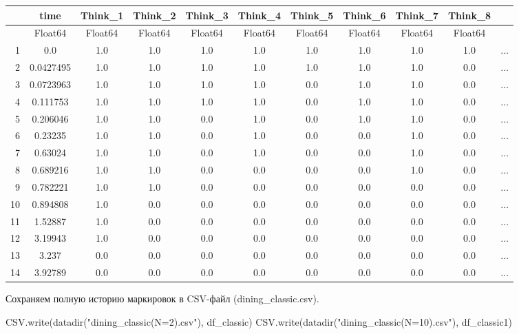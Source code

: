 \documentclass[
  12pt,
  a4paper,
  DIV=11,
  numbers=noendperiod]{scrreprt}
\newenvironment{Shaded}{\begin{snugshade}}{\end{snugshade}}
\newcommand{\FunctionTok}[1]{\textcolor[rgb]{0.28,0.35,0.67}{#1}}
\newcommand{\NormalTok}[1]{\textcolor[rgb]{0.00,0.23,0.31}{#1}}
\newcommand{\StringTok}[1]{\textcolor[rgb]{0.13,0.47,0.30}{#1}}
\begin{document}
\begin{tabular}{r|cccccccccc}
    & time & Think\_1 & Think\_2 & Think\_3 & Think\_4 & Think\_5 & Think\_6 & Think\_7 & Think\_8 & \\
    \hline
    & Float64 & Float64 & Float64 & Float64 & Float64 & Float64 & Float64 & Float64 & Float64 & \\
    \hline
    1 & 0.0 & 1.0 & 1.0 & 1.0 & 1.0 & 1.0 & 1.0 & 1.0 & 1.0 & $\dots$ \\
    2 & 0.0427495 & 1.0 & 1.0 & 1.0 & 1.0 & 1.0 & 1.0 & 1.0 & 0.0 & $\dots$ \\
    3 & 0.0723963 & 1.0 & 1.0 & 1.0 & 1.0 & 0.0 & 1.0 & 1.0 & 0.0 & $\dots$ \\
    4 & 0.111753 & 1.0 & 1.0 & 1.0 & 1.0 & 0.0 & 1.0 & 1.0 & 0.0 & $\dots$ \\
    5 & 0.206046 & 1.0 & 1.0 & 0.0 & 1.0 & 0.0 & 1.0 & 1.0 & 0.0 & $\dots$ \\
    6 & 0.23235 & 1.0 & 1.0 & 0.0 & 1.0 & 0.0 & 0.0 & 1.0 & 0.0 & $\dots$ \\
    7 & 0.63024 & 1.0 & 1.0 & 0.0 & 1.0 & 0.0 & 0.0 & 1.0 & 0.0 & $\dots$ \\
    8 & 0.689216 & 1.0 & 1.0 & 0.0 & 0.0 & 0.0 & 0.0 & 1.0 & 0.0 & $\dots$ \\
    9 & 0.782221 & 1.0 & 1.0 & 0.0 & 0.0 & 0.0 & 0.0 & 0.0 & 0.0 & $\dots$ \\
    10 & 0.894808 & 1.0 & 0.0 & 0.0 & 0.0 & 0.0 & 0.0 & 0.0 & 0.0 & $\dots$ \\
    11 & 1.52887 & 1.0 & 0.0 & 0.0 & 0.0 & 0.0 & 0.0 & 0.0 & 0.0 & $\dots$ \\
    12 & 3.19943 & 1.0 & 0.0 & 0.0 & 0.0 & 0.0 & 0.0 & 0.0 & 0.0 & $\dots$ \\
    13 & 3.237 & 0.0 & 0.0 & 0.0 & 0.0 & 0.0 & 0.0 & 0.0 & 0.0 & $\dots$ \\
    14 & 3.92789 & 0.0 & 0.0 & 0.0 & 0.0 & 0.0 & 0.0 & 0.0 & 0.0 & $\dots$ \\
\end{tabular}

Сохраняем полную историю маркировок в CSV-файл (dining\_classic.csv).

\begin{Shaded}
\begin{Highlighting}[]
\NormalTok{CSV.}\FunctionTok{write}\NormalTok{(}\FunctionTok{datadir}\NormalTok{(}\StringTok{"dining\_classic(N=2).csv"}\NormalTok{), df\_classic)}
\NormalTok{CSV.}\FunctionTok{write}\NormalTok{(}\FunctionTok{datadir}\NormalTok{(}\StringTok{"dining\_classic(N=10).csv"}\NormalTok{), df\_classic1)}
\end{Highlighting}
\end{Shaded}
\end{document}
